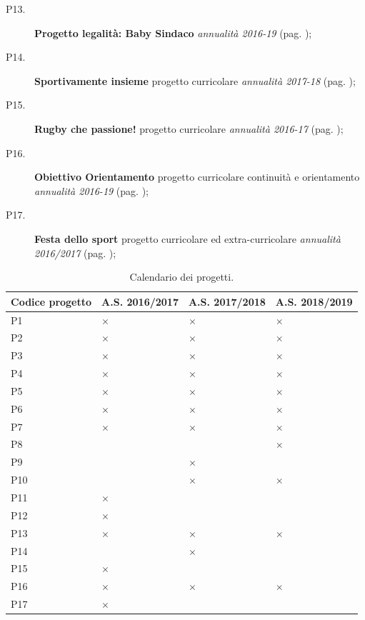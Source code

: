 \documentclass[12pt,a4paper,oneside]{memoir}
\begin{document}
\begin{description}
\item[P13.] \textbf{Progetto legalità: Baby Sindaco} \emph{annualità 2016-19} (pag. \pageref{P13});
\item[P14.] \textbf{Sportivamente insieme} progetto curricolare \emph{annualità 2017-18} (pag. \pageref{P14});
\item[P15.] \textbf{Rugby che passione!} progetto curricolare \emph{annualità 2016-17} (pag. \pageref{P15});
\item[P16.] \textbf{Obiettivo Orientamento} progetto curricolare continuità e orientamento \emph{annualità 2016-19} (pag. \pageref{P16});
\item[P17.] \textbf{Festa dello sport} progetto curricolare ed extra-curricolare \emph{annualità 2016/2017} (pag. \pageref{P17});
\end{description}

\begin{table}[htp]
\caption{Calendario dei progetti.}  \label{calendario-progetti}
\footnotesize
\begin{tabular}{|>{\raggedright}p{2.96cm}|>{\raggedright}p{2.96cm}|>{\raggedright}p{2.96cm}|>{\raggedright\arraybackslash}p{2.96cm}|}
\hline
\rowcolor{violetto}
Codice progetto&A.S. 2016/2017&A.S. 2017/2018&A.S. 2018/2019\\
\hline
P1&$\times$&$\times$&$\times$\\ \hline
P2&$\times$&$\times$&$\times$\\ \hline
P3&$\times$&$\times$&$\times$\\ \hline
P4&$\times$&$\times$&$\times$\\ \hline
P5&$\times$&$\times$&$\times$\\ \hline
P6&$\times$&$\times$&$\times$\\ \hline
P7&$\times$&$\times$&$\times$\\ \hline
P8&&&$\times$\\ \hline
P9&&$\times$&\\ \hline
P10&&$\times$&$\times$\\ \hline
P11&$\times$&&\\ \hline
P12&$\times$&&\\ \hline
P13&$\times$&$\times$&$\times$\\ \hline
P14&&$\times$&\\ \hline
P15&$\times$&&\\ \hline
P16&$\times$&$\times$&$\times$\\ \hline
P17&$\times$&&\\ \hline
\end{tabular}
\end{table}
\end{document}
